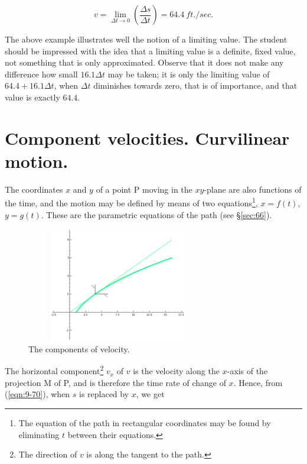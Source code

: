 \[
v = \lim_{\Delta t \to 0} \left ( \frac{\Delta s}{\Delta t} \right ) = 64.4 \ ft./sec.
\]

The above example illustrates well the notion of a limiting value. 
The student should be impressed with the idea that a limiting value is a 
definite, fixed value, not something that is only approximated. 
Observe that it does not make any difference how small 
$16.1 \Delta t$ may be taken; it is only the limiting value of
$64.4 + 16.1\Delta t$,
when $\Delta t$ diminishes towards zero, that is of importance, 
and that value is exactly $64.4$.

\section{Component velocities. Curvilinear motion.} 
\label{sec:71}

The coordinates $x$ and $y$ of a point P moving in the $xy$-plane are 
also functions of the time, and the motion may be defined by means of 
two equations\footnote{The equation of the path in rectangular 
coordinates may be found by eliminating $t$ between their equations.},
$x = f(t)$, $y = g(t)$. 
These are the parametric equations of the path (see \S \ref{sec:66}). %

\begin{figure}[h!]
\begin{minipage}{\textwidth}
\begin{center}
\includegraphics[height=5cm,width=8cm]{vel-comps2.eps}
\end{center}
\end{minipage}
\caption{The components of velocity.}
\label{fig:vel-comps}
\end{figure}


The horizontal component\footnote{The direction of $v$ is along 
the tangent to the path.}
$v_x$ of $v$ is the velocity along the $x$-axis of 
the projection M of P, and is therefore the time rate of change of $x$. 
Hence, from (\ref{eqn:9-70}), %
when $s$ is replaced by $x$, we get

